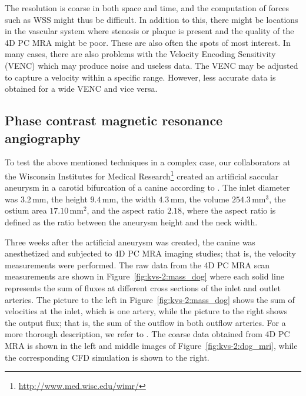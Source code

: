 The resolution is coarse in both space and time, and the computation of
forces such as WSS might thus be difficult. In addition to this, there
might be locations in the vascular system where stenosis or plaque is
present and the quality of the 4D PC MRA might be poor. These are also
often the spots of most interest. In many cases, there are also
problems with the Velocity Encoding Sensitivity (VENC) which may
produce noise and useless data. The VENC may be adjusted to capture a
velocity within a specific range. However, less accurate data is
obtained for a wide VENC and vice versa.

\subsection{Phase contrast magnetic resonance angiography}

To test the above mentioned techniques in a complex case, our
collaborators at the Wisconsin Institutes for Medical
Research\footnote{\url{http://www.med.wisc.edu/wimr/}} created an
artificial saccular aneurysm in a carotid bifurcation of a canine
according to \citet{GermanBlack1965}. The inlet diameter was
$3.2\,\mathrm{mm}$, the height $9.4\,\mathrm{mm}$, the width
$4.3\,\mathrm{mm}$, the volume $254.3\,\mathrm{mm}^3$, the ostium area
$17.10\,\mathrm{mm}^2$, and the aspect ratio $2.18$, where the aspect
ratio is defined as the ratio between the aneurysm height and the neck
width.

Three weeks after the artificial aneurysm was created, the canine was
anesthetized and subjected to 4D PC MRA imaging studies; that is, the
velocity measurements were performed. The raw data from the 4D PC MRA
scan measurements are shown in Figure~\ref{fig:kvs-2:mass_dog} where
each solid line represents the sum of fluxes at different cross
sections of the inlet and outlet arteries. The picture to the left in
Figure~\ref{fig:kvs-2:mass_dog} shows the sum of velocities at the
inlet, which is one artery, while the picture to the right shows the
output flux; that is, the sum of the outflow in both outflow
arteries. For a more thorough description, we refer
to \citet{JiangJohnsonValen-SendstadEtAl2010}.  The coarse data
obtained from 4D PC MRA is shown in the left and middle images of
Figure~\ref{fig:kvs-2:dog_mri}, while the corresponding CFD simulation
is shown to the right.

